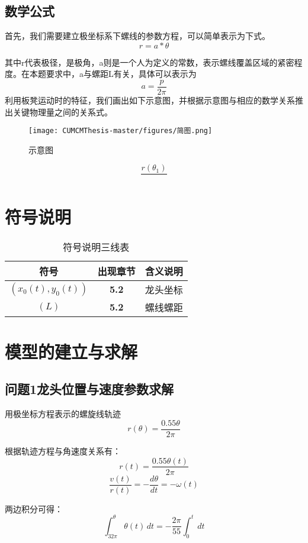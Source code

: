 \documentclass[withoutpreface,bwprint]{cumcmthesis1} %
\begin{document}
\subsection{数学公式}
首先，我们需要建立极坐标系下螺线的参数方程，可以简单表示为下式。
\begin{equation}
\label{eq1}
    r = a*{\theta}
\end{equation}
\par
其中r代表极径，\text{$\theta$}是极角，a则是一个人为定义的常数，表示螺线覆盖区域的紧密程度。在本题要求中，a与螺距L有关，具体可以表示为
\begin{equation}
    \label{eq1}
    a  = \frac{p}{2\pi}
\end{equation}
利用板凳运动时的特征，我们画出如下示意图，并根据示意图与相应的数学关系推出关键物理量之间的关系式。
\begin{figure}
    \centering
    \texttt{[image: CUMCMThesis-master/figures/简图.png]}
    \caption{示意图}
    \label{fig:enter-label}
\end{figure}
\begin{equation}
    \frac{r(\theta_1)}{}
\end{equation}
\section{符号说明}
\begin{table}[h!]
    \centering
    \caption{符号说明三线表}
    \begin{tabular}{c|cc}
    \toprule %
    符号 & 出现章节&含义说明 \\
    \midrule %
    $(x_{0}(t),y_{0}(t))$ & \textbf{5.2}&龙头坐标 \\
    $(L)$ &\textbf{5.2}&螺线螺距  \\
    \bottomrule %
    \end{tabular}
    \end{table}


\section{模型的建立与求解}
\subsection{\textbf{问题1}龙头位置与速度参数求解}
用极坐标方程表示的螺旋线轨迹
\[
r(\theta)=\frac{0.55 \theta}{2 \pi}
\]
\par
根据轨迹方程与角速度关系有：
\[
    r(t)=\frac{0.55 \theta(t)}{2 \pi} 
\]
\[
    \frac{v(t)}{r(t)}=-\frac{d \theta}{dt}=-\omega (t)
\]
\par
两边积分可得：
\[
\int_{32 \pi}^{\theta}  \theta (t)\,dt =-\frac{2 \pi}{55}\int_{0}^{t}  \,dt 
\]
\end{document}
